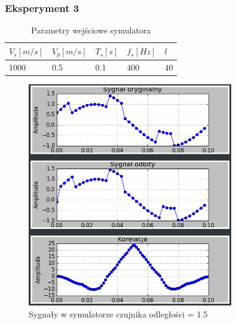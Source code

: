 \documentclass{article}
\begin{document}
{        \subsubsection{Eksperyment 3} {
            \begin{table}[h!]
                \centering
                \begin{tabular}{|l|l|l|l|l|}
                    \hline
                    $V_s[m/s]$ & $V_p[m/s]$ & $T_s[s]$ & $f_s[Hz]$ & $l$ \\ \hline
                    1000       & 0.5        & 0.1      & 400       & 40 \\ \hline
                \end{tabular}
                \caption{Parametry wejściowe symulatora}
            \end{table}
            \begin{figure}[h!]
                \centering
                \includegraphics[width=0.8\textwidth]{img/sim9.png}
                \caption{Sygnały w symulatorze czujnika odległości = 1.5}
            \end{figure}
            \begin{figure}[h!]
                \centering

\end{figure}}}
\end{document}

